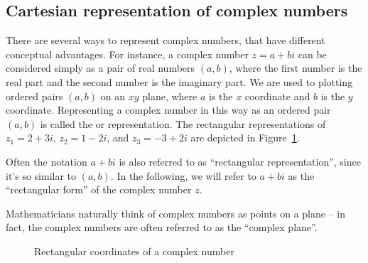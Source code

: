 \subsection{Cartesian representation of complex numbers}
There are several ways to represent complex numbers, that have different conceptual advantages.
For instance, a complex number $z=a+bi$ can be considered simply as a pair of real numbers $(a,b)$, where the first number is the real part and the second number is the imaginary part. We are used to plotting ordered pairs $(a,b)$  on an $xy$ plane, where $a$ is the $x$ coordinate and $b$
is the $y$ coordinate. Representing a complex number in this way as an ordered pair $(a,b)$  is called the 
 or  representation. The rectangular
representations of $z_{1}=2+3i$, $z_{2}=1-2i$, and $z_{3}=-3+2i$
are depicted in Figure~\ref{rectcoord}.

Often the notation $a + bi$ is also referred to as ``rectangular representation'', since it's so similar to $(a,b)$. In the following, we will refer to $a + bi$ as the ``rectangular form'' of the complex number $z$.

Mathematicians naturally think of complex numbers as points on a plane -- in fact, the complex numbers are often referred to as the ``complex plane''.
%
\begin{figure}[hbt]  %
\begin{center}
\end{center}
\caption{Rectangular coordinates of a complex number}
\label{rectcoord}
\end{figure}

